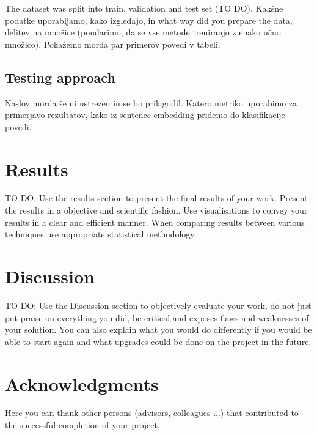 \documentclass[fleqn,moreauthors,10pt]{ds_report}
\begin{document}
The dataset was split into train, validation and test set (TO DO).
Kakšne podatke uporabljamo, kako izgledajo, in what way did you prepare the data, delitev na množice (poudarimo, da se vse metode treniranjo z enako učno množico).
Pokažemo morda par primerov povedi v tabeli.


\subsection*{Testing approach}
Naslov morda še ni ustrezen in se bo prilagodil.
Katero metriko uporabimo za primerjavo rezultatov, kako iz sentence embedding pridemo do klasifikacije povedi.






\section*{Results}

TO DO:
Use the results section to present the final results of your work. Present the results in a objective and scientific fashion. Use visualisations to convey your results in a clear and efficient manner. When comparing results between various techniques use appropriate statistical methodology.






\section*{Discussion}

TO DO:
Use the Discussion section to objectively evaluate your work, do not just put praise on everything you did, be critical and exposes flaws and weaknesses of your solution. You can also explain what you would do differently if you would be able to start again and what upgrades could be done on the project in the future.






\section*{Acknowledgments}

Here you can thank other persons (advisors, colleagues ...) that contributed to the successful completion of your project.




\end{document}
